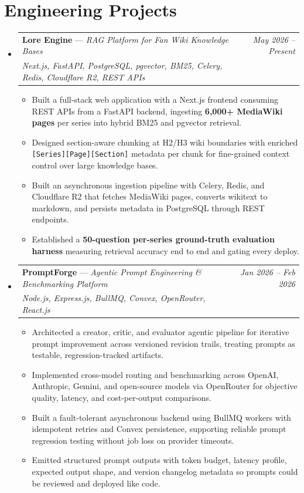 \documentclass[a4paper,11pt]{article}
\makeatletter
\newcommand{\resumeProject}[4]{
\vspace{0.5mm}\item
    \begin{tabular*}{0.98\textwidth}[t]{l@{\extracolsep{\fill}}r}
        \textbf{#1} \textnormal{---} \textit{#2} & \textit{\footnotesize{#4}} \\
        \footnotesize{\textit{#3}} & \\
    \end{tabular*}
    \vspace{-2.4mm}
}
\newcommand{\resumeSubHeadingListStart}{\begin{itemize}[leftmargin=*,labelsep=0mm]}
\newcommand{\resumeItemListStart}{\begin{justify}\begin{itemize}[leftmargin=3ex, rightmargin=2ex, noitemsep,labelsep=1.2mm,itemsep=0mm]\small}
\newcommand{\resumeSubHeadingListEnd}{\end{itemize}\vspace{2mm}}
\newcommand{\resumeItemListEnd}{\end{itemize}\end{justify}\vspace{-2mm}}
\makeatother
\begin{document}
\section{\textbf{Engineering Projects}}
\resumeSubHeadingListStart
    \resumeProject
      {Lore Engine}{RAG Platform for Fan Wiki Knowledge Bases}
      {Next.js, FastAPI, PostgreSQL, pgvector, BM25, Celery, Redis, Cloudflare R2, REST APIs}
      {May 2026 -- Present}
      \resumeItemListStart
        \item {Built a full-stack web application with a Next.js frontend consuming REST APIs from a FastAPI backend, ingesting \textbf{6,000+ MediaWiki pages} per series into hybrid BM25 and pgvector retrieval.}
        \item {Designed section-aware chunking at H2/H3 wiki boundaries with enriched \texttt{[Series][Page][Section]} metadata per chunk for fine-grained context control over large knowledge bases.}
        \item {Built an asynchronous ingestion pipeline with Celery, Redis, and Cloudflare R2 that fetches MediaWiki pages, converts wikitext to markdown, and persists metadata in PostgreSQL through REST endpoints.}
        \item {Established a \textbf{50-question per-series ground-truth evaluation harness} measuring retrieval accuracy end to end and gating every deploy.}
      \resumeItemListEnd
    \vspace{-2mm}
    \resumeProject
      {PromptForge}{Agentic Prompt Engineering \& Benchmarking Platform}
      {Node.js, Express.js, BullMQ, Convex, OpenRouter, React.js}
      {Jan 2026 -- Feb 2026}
      \resumeItemListStart
        \item {Architected a creator, critic, and evaluator agentic pipeline for iterative prompt improvement across versioned revision trails, treating prompts as testable, regression-tracked artifacts.}
        \item {Implemented cross-model routing and benchmarking across OpenAI, Anthropic, Gemini, and open-source models via OpenRouter for objective quality, latency, and cost-per-output comparisons.}
        \item {Built a fault-tolerant asynchronous backend using BullMQ workers with idempotent retries and Convex persistence, supporting reliable prompt regression testing without job loss on provider timeouts.}
        \item {Emitted structured prompt outputs with token budget, latency profile, expected output shape, and version changelog metadata so prompts could be reviewed and deployed like code.}
      \resumeItemListEnd
\resumeSubHeadingListEnd
\vspace{-8.5mm}
\end{document}
